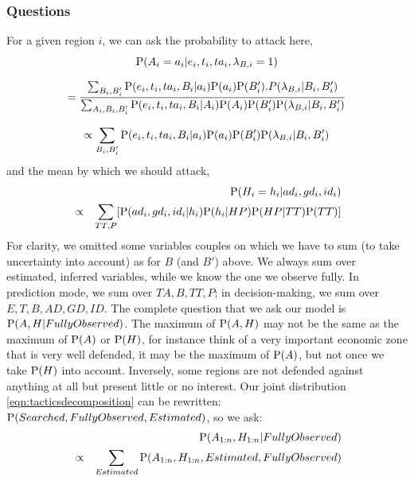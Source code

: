 \subsubsection{Questions}
For a given region $i$, we can ask the probability to attack here,
\begin{equation}
\mathrm{P}(A_i=a_i|e_i,t_i,ta_i,\lambda_{B,i}=1)
\end{equation}
\vspace{-0.2cm}
\begin{small}
\begin{equation}
= \frac{\sum_{B_i,B_i'}\mathrm{P}(e_i,t_i,ta_i,B_i|a_i)\mathrm{P}(a_i)\mathrm{P}(B_i').P(\lambda_{B,i}|B_i,B_i')}{\sum_{A_i,B_i,B_i'}\mathrm{P}(e_i,t_i,ta_i,B_i|A_i)\mathrm{P}(A_i)\mathrm{P}(B_i')\mathrm{P}(\lambda_{B,i}|B_i,B_i')}
\end{equation}
\end{small}
\vspace{-0.2cm}
\begin{equation}
\propto \sum_{B_i,B_i'}\mathrm{P}(e_i,t_i,ta_i,B_i|a_i)\mathrm{P}(a_i)\mathrm{P}(B_i')\mathrm{P}(\lambda_{B,i}|B_i,B_i')
\end{equation}
and the mean by which we should attack,
\begin{eqnarray}
& & \mathrm{P}(H_i=h_i|ad_i,gd_i,id_i) \\
& \propto & \sum_{TT,P}[\mathrm{P}(ad_i,gd_i,id_i|h_i)\mathrm{P}(h_i|HP)\mathrm{P}(HP|TT)\mathrm{P}(TT)]
\end{eqnarray}
For clarity, we omitted some variables couples on which we have to sum (to take uncertainty into account) as for $B$ (and $B'$) above. We always sum over estimated, inferred variables, while we know the one we observe fully. In prediction mode, we sum over $TA,B,TT,P$; in decision-making, we sum over $E,T,B,AD,GD,ID$. 
The complete question that we ask our model is $\mathrm{P}(A,H|FullyObserved)$. The maximum of $\mathrm{P}(A,H)$ may not be the same as the maximum of $\mathrm{P}(A)$ or $\mathrm{P}(H)$, for instance think of a very important economic zone that is very well defended, it may be the maximum of $\mathrm{P}(A)$, but not once we take $\mathrm{P}(H)$ into account. Inversely, some regions are not defended against anything at all but present little or no interest. Our joint distribution \ref{eqn:tacticsdecomposition} can be rewritten: $\mathrm{P}(Searched,FullyObserved,Estimated)$, so we ask:
\begin{eqnarray}
& & \mathrm{P}(A_{1:n},H_{1:n}|FullyObserved) \label{eqn:tacticsquestion}\\
& \propto & \sum_{Estimated}\mathrm{P}(A_{1:n},H_{1:n},Estimated,FullyObserved)
\end{eqnarray}

